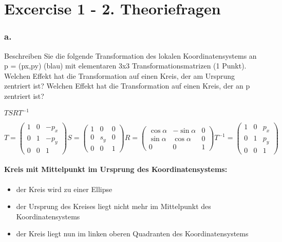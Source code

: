 \documentclass[12pt]{scrreprt}
\begin{document}


\chapter*{Excercise 1 - 2. Theoriefragen}

\subsection*{a.}
Beschreiben Sie die folgende Transformation des lokalen Koordinatensystems an p = (px,py) (blau) mit
elementaren 3x3 Transformationsmatrizen (1 Punkt). Welchen Effekt hat die Transformation auf einen
Kreis, der am Ursprung zentriert ist? Welchen Effekt hat die Transformation auf einen Kreis, der an p
zentriert ist?


\begin{center}
\(
T S R T^{-1}
\)
\end{center}

\(
T = \left(
	\begin{array}{ccc}
		1 & 0 & -p_{x} \\
		0 & 1 & -p_{y} \\
		0 & 0 & 1
	\end{array}
\right)
S = \left(
	\begin{array}{ccc}
		1 & 0 & 0 \\
		0 & s_{y} & 0 \\
		0 & 0 & 1
	\end{array}
\right)
R = \left(
	\begin{array}{ccc}
		\cos\alpha & -\sin\alpha & 0 \\
		\sin\alpha & \cos\alpha & 0 \\
		0 & 0 & 1
	\end{array}
\right)
T^{-1} = \left(
	\begin{array}{ccc}
		1 & 0 & p_{x} \\
		0 & 1 & p_{y} \\
		0 & 0 & 1
	\end{array}
\right)
\)

\subsubsection*{Kreis mit Mittelpunkt im Ursprung des Koordinatensystems:}

\begin{itemize}
  \item der Kreis wird zu einer Ellipse
  \item der Ursprung des Kreises liegt nicht mehr im Mittelpunkt des
Koordinatensystems
  \item der Kreis liegt nun im linken oberen Quadranten des Koordinatensystems
\end{itemize}
\end{document}
